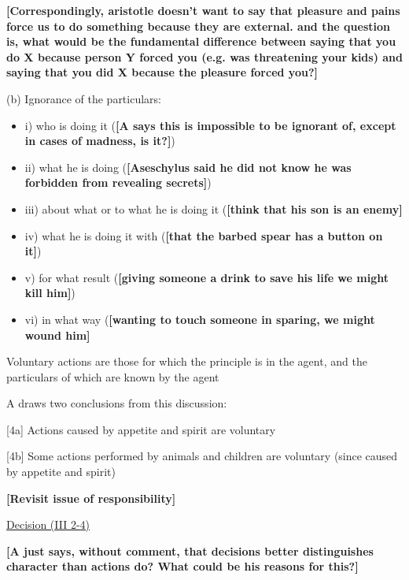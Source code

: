\documentclass[11pt]{article}
\begin{document}
\noindent\textbf{[Correspondingly, aristotle doesn't want to say that pleasure and pains force us to do something because they are external. and the question is, what would be the fundamental difference between saying that you do X because person Y forced you (e.g. was threatening your kids) and saying that you did X because the pleasure forced you?]}
\vspace*{1mm}

(b) Ignorance of the particulars:\begin{itemize}\item{i) who is doing it (\textbf{[A says this is impossible to be ignorant of, except in cases of madness, is it?]})}\item{ii) what he is doing (\textbf{[Aseschylus said he did not know he was forbidden from revealing secrets]})}\item{iii) about what or to what he is doing it (\textbf{[think that his son is an enemy]}}\item{iv) what he is doing it with (\textbf{[that the barbed spear has a button on it]})}\item{v) for what result (\textbf{[giving someone a drink to save his life we might kill him]})}\item{vi) in what way (\textbf{[wanting to touch someone in sparing, we might wound him]}}\end{itemize}
\vspace*{1mm}
\vspace{1mm}

\noindent [3] Voluntary actions are those for which the principle is in the agent, and the particulars of which are known by the agent
\vspace*{1mm}

\noindent [4] A draws two conclusions from this discussion:
\vspace*{1mm}

[4a] Actions caused by appetite and spirit are voluntary
\vspace*{1mm}

[4b] Some actions performed by animals and children are voluntary (since caused by appetite and spirit)
\vspace*{2mm}

\noindent\textbf{[Revisit issue of responsibility]}
\vspace*{3mm}

\noindent\underline{Decision (III 2-4)}
\vspace*{2mm}

\noindent\textbf{[A just says, without comment, that decisions better distinguishes character than actions do? What could be his reasons for this?]}
\vspace*{2mm}
\end{document}
